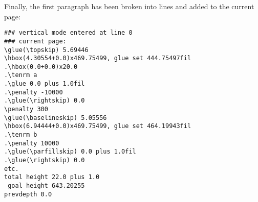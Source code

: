 \documentclass[twoside,letterpaper,openright]{rapport3}
\begin{document}
Finally, the first paragraph has been broken into lines and 
added to the current page:\begin{verbatim}
### vertical mode entered at line 0
### current page:
\glue(\topskip) 5.69446
\hbox(4.30554+0.0)x469.75499, glue set 444.75497fil
.\hbox(0.0+0.0)x20.0
.\tenrm a
.\glue 0.0 plus 1.0fil
.\penalty -10000
.\glue(\rightskip) 0.0
\penalty 300
\glue(\baselineskip) 5.05556
\hbox(6.94444+0.0)x469.75499, glue set 464.19943fil
.\tenrm b
.\penalty 10000
.\glue(\parfillskip) 0.0 plus 1.0fil
.\glue(\rightskip) 0.0
etc.
total height 22.0 plus 1.0
 goal height 643.20255
prevdepth 0.0
\end{verbatim}


\endofchapter
\end{document}
